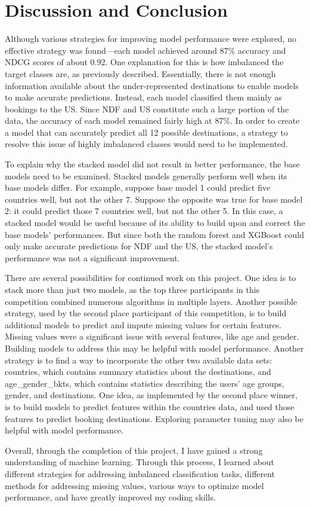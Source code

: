 \documentclass{article}
\begin{document}
\section{Discussion and Conclusion}

Although various strategies for improving model performance were explored, no effective strategy was found---each model achieved around 87\% accuracy and NDCG scores of about 0.92. One explanation for this is how imbalanced the target classes are, as previously described. Essentially, there is not enough information available about the under-represented destinations to enable models to make accurate predictions. Instead, each model classified them mainly as bookings to the US. Since NDF and US constitute such a large portion of the data, the accuracy of each model remained fairly high at 87\%. In order to create a model that can accurately predict all 12 possible destinations, a strategy to resolve this issue of highly imbalanced classes would need to be implemented.

To explain why the stacked model did not result in better performance, the base models need to be examined. Stacked models generally perform well when its base models differ. For example, suppose base model 1 could predict five countries well, but not the other 7. Suppose the opposite was true for base model 2: it could predict those 7 countries well, but not the other 5. In this case, a stacked model would be useful because of its ability to build upon and correct the base models' performances. But since both the random forest and XGBoost could only make accurate predictions for NDF and the US, the stacked model's performance was not a significant improvement. 

There are several possibilities for continued work on this project. One idea is to stack more than just two models, as the top three participants in this competition combined numerous algorithms in multiple layers. Another possible strategy, used by the second place participant of this competition, is to build additional models to predict and impute missing values for certain features. Missing values were a significant issue with several features, like age and gender. Building models to address this may be helpful with model performance. Another strategy is to find a way to incorporate the other two available data sets: countries, which contains summary statistics about the destinations, and age\_gender\_bkts, which contains statistics describing the users' age groups, gender, and destinations. One idea, as implemented by the second place winner, is to build models to predict features within the countries data, and used those features to predict booking destinations. Exploring parameter tuning may also be helpful with model performance. 

Overall, through the completion of this project, I have gained a strong understanding of machine learning. Through this process, I learned about different strategies for addressing imbalanced classification tasks, different methods for addressing missing values, various ways to optimize model performance, and have greatly improved my coding skills.





\end{document}
